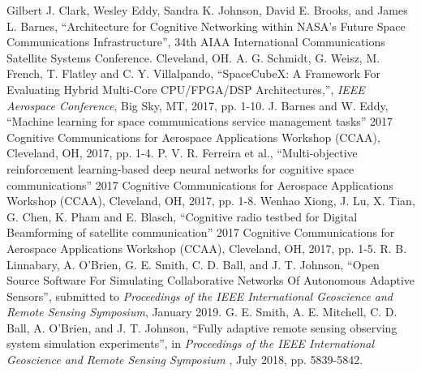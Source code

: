 \documentclass[conference]{IEEEtran}
\begin{document}
\small
\begin{thebibliography}{9}
 {
    Gilbert J. Clark, Wesley Eddy, Sandra K. Johnson, David E. Brooks, and
    James L. Barnes, ``Architecture for Cognitive Networking within NASA’s
    Future Space Communications Infrastructure'', 34th AIAA International
    Communications Satellite Systems Conference. Cleveland, OH.}
 {
    A. G. Schmidt, G. Weisz, M. French, T. Flatley and C. Y. Villalpando,
    ``SpaceCubeX: A Framework For Evaluating Hybrid Multi-Core CPU/FPGA/DSP
    Architectures,'', \textit{IEEE Aerospace Conference}, Big Sky, MT, 2017,
    pp. 1-10.}
 {
    J. Barnes and W. Eddy, ``Machine learning for space communications service
    management tasks'' 2017 Cognitive Communications for Aerospace Applications
    Workshop (CCAA), Cleveland, OH, 2017, pp. 1-4.
  }
 {
    P. V. R. Ferreira et al.,
    ``Multi-objective reinforcement learning-based deep neural networks for
    cognitive space communications''
    2017 Cognitive Communications for Aerospace Applications Workshop (CCAA),
    Cleveland, OH, 2017, pp. 1-8.
  }
 {
    Wenhao Xiong, J. Lu, X. Tian, G. Chen, K. Pham and E. Blasch, ``Cognitive
    radio testbed for Digital Beamforming of satellite communication'' 2017
    Cognitive Communications for Aerospace Applications Workshop (CCAA),
    Cleveland, OH, 2017, pp. 1-5.
}
 {
    R. B. Linnabary, A. O'Brien, G. E. Smith, C. D. Ball, and J. T. Johnson,
    ``Open Source Software For Simulating Collaborative Networks Of Autonomous
    Adaptive Sensors'', submitted to {\it Proceedings of the IEEE International
      Geoscience and Remote Sensing Symposium}, January 2019.}
 {
    G. E. Smith, A. E. Mitchell, C. D. Ball, A. O'Brien, and J. T. Johnson,
    ``Fully adaptive remote sensing observing system simulation experiments'',
    in {
      \it Proceedings of the IEEE International Geoscience and Remote Sensing
      Symposium} , July 2018, pp. 5839-5842.}
\end{thebibliography}
\end{document}

